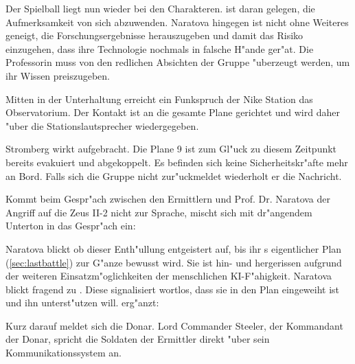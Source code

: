 Der Spielball liegt nun wieder bei den Charakteren. \xl{} ist daran gelegen, die Aufmerksamkeit von sich abzuwenden. Naratova hingegen ist nicht ohne Weiteres geneigt, die Forschungsergebnisse herauszugeben und damit das Risiko einzugehen, dass ihre Technologie nochmals in falsche H"ande ger"at. Die Professorin muss von den redlichen Absichten der Gruppe "uberzeugt werden, um ihr Wissen preiszugeben.

Mitten in der Unterhaltung erreicht ein Funkspruch der Nike Station das Observatorium. Der Kontakt ist an die gesamte Plane gerichtet und wird daher "uber die Stationslautsprecher wiedergegeben.


Stromberg wirkt aufgebracht. Die Plane 9 ist zum Gl"uck zu diesem Zeitpunkt bereits evakuiert und abgekoppelt. Es befinden sich keine Sicherheitskr"afte mehr an Bord. Falls sich die Gruppe nicht zur"uckmeldet wiederholt er die Nachricht. 

Kommt beim Gespr"ach zwischen den Ermittlern und Prof. Dr. Naratova der Angriff auf die Zeus II-2 nicht zur Sprache, mischt sich \xl{} mit dr"angendem Unterton in das Gespr"ach ein:


Naratova blickt ob dieser Enth"ullung entgeistert auf, bis ihr \xl{}s eigentlicher Plan (\cref{sec:lastbattle}) zur G"anze bewusst wird. Sie ist hin- und hergerissen aufgrund der weiteren Einsatzm"oglichkeiten der menschlichen KI-F"ahigkeit. Naratova blickt fragend zu \ml{}. Diese signalisiert wortlos, dass sie in den Plan eingeweiht ist und ihn unterst"utzen will. \ml{} erg"anzt:


Kurz darauf meldet sich die Donar. Lord Commander Steeler, der Kommandant der Donar, spricht die Soldaten der Ermittler direkt "uber sein Kommunikationssystem an.


